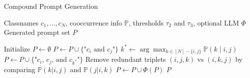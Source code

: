 \begin{algorithm}[H]
\caption{Compound Prompt Generation}
\label{alg:compound_prompt_generation}
\begin{algorithmic}[1]
\REQUIRE Classnames $c_1, \ldots, c_N$, cooccurrence info $\mathbb{P}$, thresholds $\tau_2$ and $\tau_3$, optional LLM $\Phi$
\ENSURE Generated prompt set $P$

\STATE Initialize $P \leftarrow \emptyset$
            \STATE $P \leftarrow P \cup \{\textrm{"$c_i$ and $c_j$"}\}$
                \STATE $k^{*} \leftarrow \arg\max_{k \in [N] - \{i,j\}} \mathbb{P}(k \mid i, j)$
                \STATE $P \leftarrow P \cup \{\textrm{"$c_i$, $c_j$, and $c_{k^{*}}$"}\}$
            \ENDIF
        \ENDIF
    \ENDFOR
\ENDFOR
\STATE Remove redundant triplets $(i,j,k)$ vs $(i,k,j)$ by comparing $\mathbb{P}(k|i,j)$ and $\mathbb{P}(j|i,k)$
    \STATE $P \leftarrow P \cup \Phi(P)$
\ENDIF
\RETURN $P$
\end{algorithmic}
\end{algorithm}
